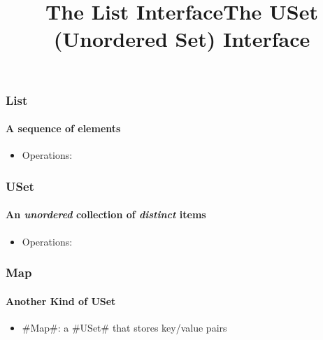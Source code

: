 \documentclass[aspectratio=169,xcolor=dvipsnames]{beamer}
\newcommand{\emphen}[1]{{\itshape #1}}
\begin{document}
\begin{frame}
\title{The List Interface}
\maketitle
\end{frame}


\begin{frame}
  \frametitle{List}
  \framesubtitle{A sequence of elements}
 
  \begin{itemize}
    \item<1-> Operations: %
  \end{itemize}
     \begin{center}
     \end{center}

\end{frame}

\begin{frame}
\title{The USet (Unordered Set) Interface}
\maketitle
\end{frame}


\begin{frame}
  \frametitle{USet}
  \framesubtitle{An \emphen{unordered} collection of \emphen{distinct} items}
  \begin{itemize}
    \item<+-> Operations: %
  \end{itemize}
     \begin{center}
     \end{center}

\end{frame}

\begin{frame}
  \frametitle{Map}
  \framesubtitle{Another Kind of USet}
 
  \begin{itemize}
    \item<+-> #Map#: a #USet# that stores key/value pairs
  \end{itemize}
     \begin{center}
     \end{center}

\end{frame}
\end{document}
